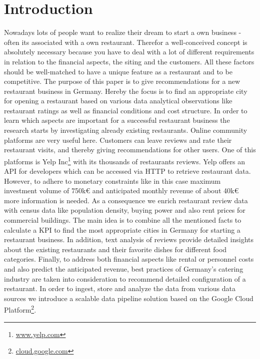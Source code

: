 \section{Introduction}
\label{sec:introduction}
Nowadays lots of people want to realize their dream to start a own business - often its associated with a own restaurant. Therefor a well-conceived concept is absolutely necessary because you have to deal with a lot of different requirements in relation to the financial aspects, the siting and the customers. All these factors should be well-matched to have a unique feature as a restaurant and to be competitive. \newline
The purpose of this paper is to give recommendations for a new restaurant business in Germany. Hereby the focus is to find an appropriate city for opening a restaurant based on various data analytical observations like restaurant ratings as well as financial conditions and cost structure.
In order to learn which aspects are important for a successful restaurant business the research starts by investigating already existing restaurants. Online community platforms are very useful here. Customers can leave reviews and rate their restaurant visits, and thereby giving recommendations for other users. One of this platforms is Yelp Inc\footnote{\href{https://www.yelp.com/}{www.yelp.com}} with its thousands of restaurants reviews. Yelp offers an \ac{API} for developers which can be accessed via HTTP to retrieve restaurant data. However, to adhere to monetary constraints like in this case maximum investment volume of 750k\euro{} and anticipated monthly revenue of about 40k\euro{} more information is needed. As a consequence we enrich restaurant review data with census data like population density, buying power and also rent prices for commercial buildings. The main idea is to combine all the mentioned facts to calculate a \ac{KPI} to find the most appropriate cities in Germany for starting a restaurant business. In addition, text analysis of reviews provide detailed insights about the existing restaurants and their favorite dishes for different food categories. Finally, to address both financial aspects like rental or personnel costs and also predict the anticipated revenue, best practices of Germany's catering industry are taken into consideration to recommend detailed configuration of a restaurant. In order to ingest, store and analyze the data from various data sources we introduce a scalable data pipeline solution based on the Google Cloud Platform\footnote{\href{https://cloud.google.com/}{cloud.google.com}}.

